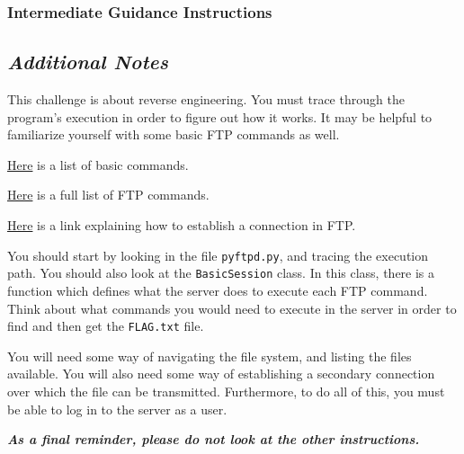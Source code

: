         \subsubsection{Intermediate Guidance Instructions}
            {\parindent0pt\singlespacing
                \subsection*{\textit{Additional Notes}}
                    This challenge is about reverse engineering. You must trace through the program's execution in order to figure out how it works. It may be helpful to familiarize yourself with some basic FTP commands as well. 

                    \href{https://kb.iu.edu/d/aenq}{Here} is a list of basic commands.

                    \href{https://en.wikipedia.org/wiki/List_of_FTP_commands}{Here} is a full list of FTP commands.

                    \href{https://www.serv-u.com/resource/tutorial/pasv-response-epsv-port-pbsz-rein-ftp-command#fac52a38-7ddb-4815-a9dc-72cc03c0a8e6}{Here} is a link explaining how to establish a connection in FTP.

                    You should start by looking in the file \lstinline`pyftpd.py`, and tracing the execution path. You should also look at the \lstinline`BasicSession` class. In this class, there is a function which defines what the server does to execute each FTP command. Think about what commands you would need to execute in the server in order to find and then get the \lstinline`FLAG.txt` file. 

                    You will need some way of navigating the file system, and listing the files available. You will also need some way of establishing a secondary connection over which the file can be transmitted. Furthermore, to do all of this, you must be able to log in to the server as a user. 

                    \textbf{\textit{As a final reminder, please do not look at the other instructions.}}
            }
        \newpage
